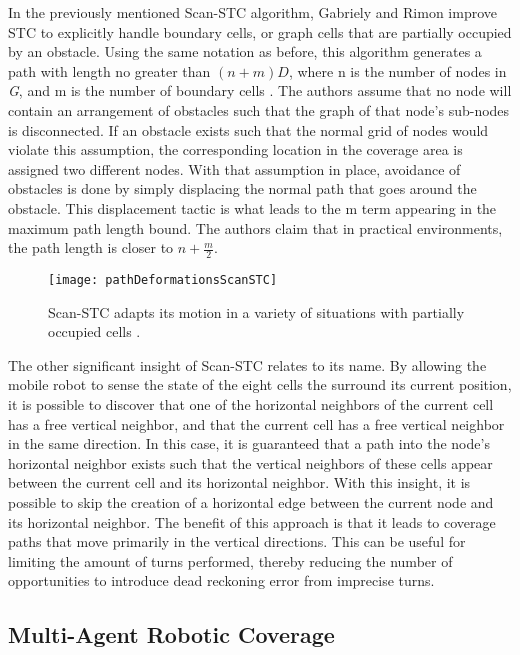 In the previously mentioned Scan-STC algorithm, Gabriely and Rimon improve STC to explicitly handle boundary cells, or graph cells that are partially occupied by an obstacle. Using the same notation as before, this algorithm generates a path with length no greater than $ (n + m)\textit{D} $, where n is the number of nodes in \textit{G}, and m is the number of boundary cells \cite{Gabriely2003}. The authors assume that no node will contain an arrangement of obstacles such that the graph of that node's sub-nodes is disconnected. If an obstacle exists such that the normal grid of nodes would violate this assumption, the corresponding location in the coverage area is assigned two different nodes. With that assumption in place, avoidance of obstacles is done by simply displacing the normal path that goes around the obstacle. This displacement tactic is what leads to the m term appearing in the maximum path length bound. The authors claim that in practical environments, the path length is closer to $ n + \frac{m}{2} $. 

\begin{figure}[H]
\texttt{[image: pathDeformationsScanSTC]}
\caption[Path Deformations in Scan-STC]{Scan-STC adapts its motion in a variety of situations with partially occupied cells \cite{Gabriely2003}.}
\end{figure}


The other significant insight of Scan-STC relates to its name. By allowing the mobile robot to sense the state of the eight cells the surround its current position, it is possible to discover that one of the horizontal neighbors of the current cell has a free vertical neighbor, and that the current cell has a free vertical neighbor in the same direction. In this case, it is guaranteed that a path into the node's horizontal neighbor exists such that the vertical neighbors of these cells appear between the current cell and its horizontal neighbor. With this insight, it is possible to skip the creation of a horizontal edge between the current node and its horizontal neighbor. The benefit of this approach is that it leads to coverage paths that move primarily in the vertical directions. This can be useful for limiting the amount of turns performed, thereby reducing the number of opportunities to introduce dead reckoning error from imprecise turns.

\subsection{Multi-Agent Robotic Coverage}

